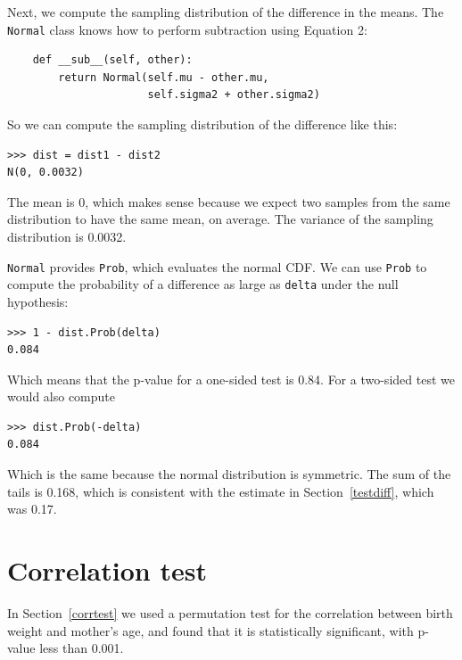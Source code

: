 \documentclass[12pt]{book}
\theoremstyle{exercise}
\begin{document}
Next, we compute the sampling distribution of the difference
in the means.  The {\tt Normal} class knows how to perform
subtraction using Equation 2:%

\begin{verbatim}
    def __sub__(self, other):
        return Normal(self.mu - other.mu,
                      self.sigma2 + other.sigma2)
\end{verbatim}

So we can compute the sampling distribution of the difference like this:

\begin{verbatim}
>>> dist = dist1 - dist2
N(0, 0.0032)
\end{verbatim}

The mean is 0, which makes sense because we expect two samples from
the same distribution to have the same mean, on average.  The variance
of the sampling distribution is 0.0032.%

{\tt Normal} provides {\tt Prob}, which evaluates the normal CDF.
We can use {\tt Prob} to compute the probability of a
difference as large as {\tt delta} under the null hypothesis:%

\begin{verbatim}
>>> 1 - dist.Prob(delta)
0.084
\end{verbatim}

Which means that the p-value for a one-sided test is 0.84.  For
a two-sided test we would also compute%
%
%

\begin{verbatim}
>>> dist.Prob(-delta)
0.084
\end{verbatim}

Which is the same because the normal distribution is symmetric.
The sum of the tails is 0.168, which is consistent with the estimate
in Section~\ref{testdiff}, which was 0.17.%



\section{Correlation test}

In Section~\ref{corrtest} we used a permutation test for the correlation
between birth weight and mother's age, and found that it is
statistically significant, with p-value less than 0.001.%
%
%
%
%
%
\end{document}
